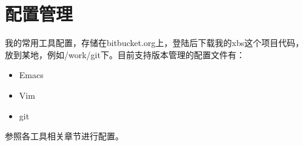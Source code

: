 \section{配置管理}
\label{sec:config}

我的常用工具配置，存储在bitbucket.org上，登陆后下载我的xbs这个项目代码，放到某地，例如/work/git下。目前支持版本管理的配置文件有：
\begin{itemize}
\item Emacs
\item Vim
\item git
\end{itemize}
参照各工具相关章节进行配置。